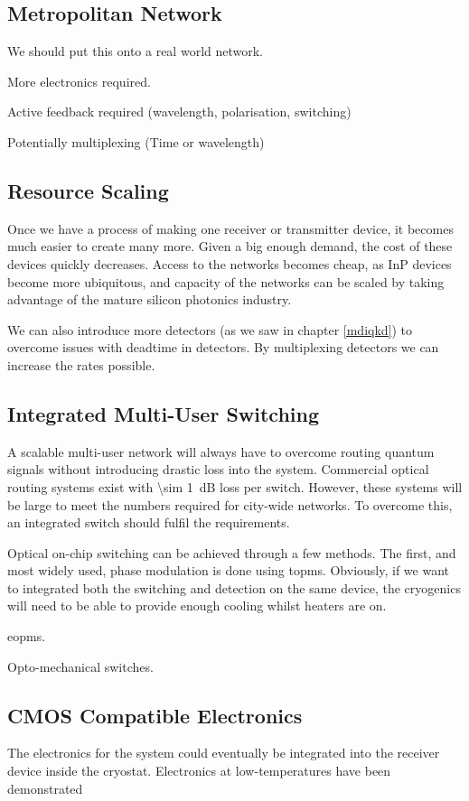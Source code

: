 \subsection{Metropolitan Network}

We should put this onto a real world network.

More electronics required.

Active feedback required (wavelength, polarisation, switching)

Potentially multiplexing (Time or wavelength)

\subsection{Resource Scaling}

Once we have a process of making one receiver or transmitter device, it becomes much easier to create many more. Given a big enough demand, the cost of these devices quickly decreases. Access to the networks becomes cheap, as \ac{InP} devices become more ubiquitous, and capacity of the networks can be scaled by taking advantage of the mature silicon photonics industry.

We can also introduce more detectors (as we saw in chapter \ref{mdiqkd}) to overcome issues with deadtime in detectors. By multiplexing detectors we can increase the rates possible.

\subsection{Integrated Multi-User Switching}

A scalable multi-user network will always have to overcome routing quantum signals without introducing drastic loss into the system. Commercial optical routing systems exist with \SI{\sim 1}{dB} loss per switch. However, these systems will be large to meet the numbers required for city-wide networks. To overcome this, an integrated switch should fulfil the requirements. 

Optical on-chip switching can be achieved through a few methods. The first, and most widely used, phase modulation is done using \acp{topm}. Obviously, if we want to integrated both the switching and detection on the same device, the cryogenics will need to be able to provide enough cooling whilst heaters are on.

\acp{eopm}.

Opto-mechanical switches.

\subsection{CMOS Compatible Electronics}

The electronics for the system could eventually be integrated into the receiver device inside the cryostat. Electronics at low-temperatures have been demonstrated \cite{bardin2019}

